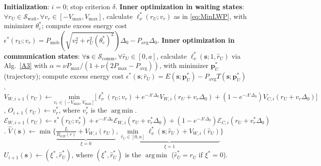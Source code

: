 \documentclass[10pt, twocolumn]{IEEEtran}
\theoremstyle{plain}
\theoremstyle{definition}
\theoremstyle{remark}
\DeclareMathOperator*{\argmin}{arg\,min}
\begin{document}
\begin{algorithm*} [t]
\caption{$(O^{*},U^{*},g(\nu),\bar{\mathcal E},V_{\cdot,0}^{next},\mathcal E_{\cdot,0}^{next})=\mathrm{VITER}(\nu,V_{\cdot,0},\mathcal E_{\cdot,0})$}\label{A1}
    \begin{algorithmic}[1]
        \scriptsize
        \State \textbf{Initialization}: $i{=}0$; stop criterion $\delta$.
        \State \textbf{Inner optimization in waiting states}: ${\forall}r_U{\in}\mathcal{S}_{\mathrm{wait}}, {\forall}v_{r}{\in}[-V_{\mathrm{max}},V_{\mathrm{max}}]$, calculate $\ell_{\nu}^{*}(r_U;v_{r})$ as in \eqref{eq:MinLWP}, with minimizer $\theta_{c}^{*}$; compute excess energy cost $\epsilon^{*}(r_U;v_{r}){=}
        P_{\mathrm{mob}}(\sqrt{v_{r}^{2} + r_U^2(\theta_c^*)^2})\Delta_0-P_{\mathrm{avg}}\Delta_0$.
    	\State \textbf{Inner optimization in communication states}: ${\forall}\mathbf{s}{\in}\mathcal{S}_{\mathrm{comm}}, {\forall}\hat{r}_{U}{\in}[0,a]$, calculate $\ell_{\nu}^{*}(\mathbf{s};1,\hat{r}_{U})$ via Alg.~\ref{A3} with
	 $\alpha=\nu P_{\max}/(1{+}\nu(2P_{\max}{-} P_{\mathrm{avg}}))$, with minimizer $\mathbf{p}_{U}^{*}$ (trajectory); compute excess energy cost $\epsilon^{*}(\mathbf{s};\hat{r}_{U}){=}E(\mathbf{s};\mathbf{p}_{U}^{*})-P_{\mathrm{avg}}T(\mathbf{s};\mathbf{p}_{U}^{*})$.
    	\Repeat
             
        	    \State $V_{W,i{+}1}(r_{U}){\gets}\underset{v_{r}{\in}[-V_{\mathrm{max}},V_{\mathrm{max}}]}{\mathrm{min}}\big[\ell_{\nu}^{*}(r_{U};v_{r}){+}e^{-\Lambda'\Delta_{0}}V_{W,i}(r_{U}{+}v_{r}\Delta_{0}){+} (1{-}e^{-\Lambda'\Delta_{0}})
	    V_{C,i}(r_{U}{+}v_{r}\Delta_{0})\big]$,
        		\State $O_{i{+}1}(r_{U})\gets v_r^*$, where $v_r^*$ is the $\argmin$.
        		\State $\mathcal E_{W,i{+}1}(r_{U}){\gets}\epsilon^{*}(r_{U};v_r^*){+}e^{-\Lambda'\Delta_{0}}\mathcal E_{W,i}(r_{U}{+}v_r^*\Delta_{0}){+}(1{-}e^{-\Lambda'\Delta_{0}})
		\mathcal E_{C,i}(r_{U}{+}v_r^*\Delta_{0})$.
        	\EndFor
        	\For{each $r{\in}[0,a]$, $\psi{\in}[0,2\pi)$ ($\mathbf s=(r_U,r,\psi)$)} 
        	    \State $\hat V(\mathbf{s}){\gets}\min\Big\{\underbrace{\frac{L}{R_{GB}(r)}{+}V_{W,i}({r}_{U})}_{\xi=0},
	    \underbrace{
	    \underset{\hat{r}_{U}{\in}[0,a]}{\min}\ell_{\nu}^{*}(\mathbf{s};\hat{r}_{U}){+}V_{W,i}(\hat{r}_{U})}_{\xi=1}\Big\}$
             \State $U_{i{+}1}(\mathbf{s})\gets (\xi^*,\hat r_U^*)$, where $(\xi^*,\hat r_U^*)$ is the $\argmin$ ($\hat r_U^*=r_U$ if $\xi^*=0$).

\end{algorithmic}
\end{algorithm*}
\end{document}
